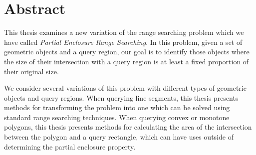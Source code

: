 \chapter*{Abstract}

This thesis examines a new variation of the range searching problem which we have called \emph{Partial Enclosure Range Searching}. 
In this problem, given a set of geometric objects and a query region, our goal is to identify those objects where the size of their intersection with a query region is at least a fixed proportion of their original size.

We consider several variations of this problem with different types of geometric objects and query regions. 
When querying line segments, this thesis presents methods for transforming the problem into one which can be solved using standard range searching techniques.
When querying convex or monotone polygons, this thesis presents methods for calculating the area of the intersection between the polygon and a query rectangle, which can have uses outside of determining the partial enclosure property.
